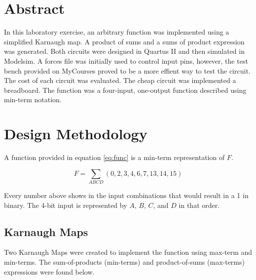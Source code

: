 \documentclass[CMPE]{KGCOEReport}
\begin{document}
\maketitle

\section*{Abstract}
In this laboratory exercise, an arbitrary function was implemented using a simplified Karnaugh map. A product of sums and a sums of product expression was generated. Both circuits were designed in Quartus II and then simulated in Modelsim. A forces file was initially used to control input pins, however, the test bench provided on MyCourses proved to be a more effient way to test the circuit. The cost of each circuit was evaluated. The cheap circuit was implemented a breadboard. The function was a four-input, one-output function described using min-term notation.

\section*{Design Methodology}

A function provided in equation \ref{eq:func} is a min-term representation of $F$.

\begin{equation}
\label{eq:func}
F = {\sum}_{ABCD} (0,2,3,4,6,7,13,14,15)
\end{equation}

Every number above shows in the input combinations that would result in a 1 in binary. The 4-bit input is represented by $A$, $B$, $C$, and $D$ in that order.

\subsection*{Karnaugh Maps}

Two Karnaugh Maps were created to implement the function using max-term and min-terms. The sum-of-products (min-terms) and product-of-sums (max-terms) expressions were found below.
\end{document}
